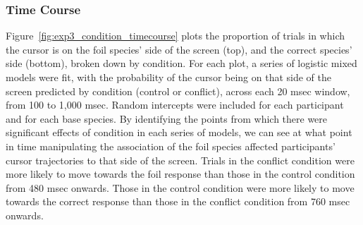 \begin{figure}[ht]
  \begin{floatrow}
  \end{floatrow}
\end{figure}


\subsubsection{Time Course}

Figure~\ref{fig:exp3_condition_timecourse} plots
the proportion of trials in which the cursor is on
the foil species' side of the screen (top),
and the correct species' side (bottom),
broken down by condition.
For each plot, a series of logistic mixed models were fit,
with the probability of the cursor being on
that side of the screen predicted by condition (control or conflict),
across each 20 msec window, from 100 to 1,000 msec.
Random intercepts were included for each participant and for each base species.
By identifying the points from which
there were significant effects of condition in each series of models,
we can see at what point in time
manipulating the association of the foil species
affected participants' cursor trajectories
to that side of the screen.
Trials in the conflict condition were more likely to move towards
the foil response than those in the control condition from 480 msec onwards.
Those in the control condition were more likely to move towards
the correct response than those in the conflict condition from 760 msec onwards.

